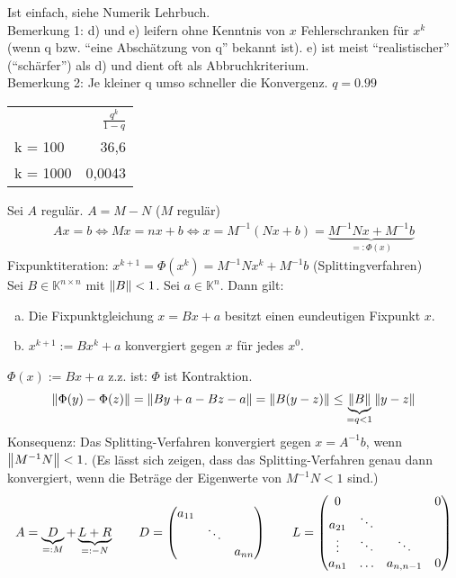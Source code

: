 \beweis Ist einfach, siehe Numerik Lehrbuch.\\
Bemerkung 1: d) und e) leifern ohne Kenntnis von $x$ Fehlerschranken für $x^k$ (wenn q bzw. ``eine Abschätzung von q'' bekannt ist).
e) ist meist ``realistischer'' (``schärfer'') als d) und dient oft als Abbruchkriterium.\\
Bemerkung 2: Je kleiner q umso schneller die Konvergenz. $q = 0.99$\\
\begin{tabular}{l | r}
           & $\frac{q^k}{1-q}$ \\
  k = 100  & 36,6 \\
  k = 1000 & 0,0043
\end{tabular}
Sei $A$ regulär. $A = M - N$ ($M$ regulär)
\begin{align*}
  Ax = b \Leftrightarrow Mx = nx + b \Leftrightarrow x = M^{-1} (Nx+b) = \underbrace{M^{-1}Nx + M^{-1}b}_{=: \Phi(x)}
\end{align*}
Fixpunktiteration: $x^{k+1} = \Phi(x^k) = M^{-1}Nx^k + M^{-1}b$ (Splittingverfahren)\\
\satz Sei $B \in \mathbb{K}^{n \times n}$ mit $\left\lVert B \right\rVert < 1$. Sei $a \in \mathbb{K}^n$. Dann gilt:
\begin{enumerate}[a)]
  \item Die Fixpunktgleichung $x = Bx + a$ besitzt einen eundeutigen Fixpunkt $x$.
  \item $x^{k+1} := Bx^k + a$ konvergiert gegen $x$ für jedes $x^0$.
\end{enumerate}
\beweis $\Phi(x) := Bx + a$ z.z. ist: $\Phi$ ist Kontraktion.\\
\begin{align*}
  \left\lVert \Phi(y) - \Phi(z) \right\rVert = \left\lVert By + a - Bz - a \right\rVert = \left\lVert B(y - z) \right\rVert \leq \underbrace{\left\lVert B \right\rVert}_{= q < 1} \left\lVert y - z \right\rVert
\end{align*}
Konsequenz: Das Splitting-Verfahren konvergiert gegen $x = A^{-1}b$, wenn $\left\lVert M^{-1}N \right\rVert < 1$. (Es
lässt sich zeigen, dass das Splitting-Verfahren genau dann konvergiert, wenn die Beträge der Eigenwerte
von $M^{-1}N < 1$ sind.)
\begin{align*}
  A = \underbrace{D}_{=: M} + \underbrace{L + R}_{=: -N} \qquad D = \begin{pmatrix} a_{11} & & \\ & \ddots & \\ & & a_{nn} \end{pmatrix} \qquad
  L = \begin{pmatrix}
    0      &        &        & 0 \\
    a_{21} & \ddots &        &   \\
    \vdots & \ddots & \ddots &   \\
    a_{n1} & \ldots & a_{n,n-1} & 0
  \end{pmatrix}
\end{align*}
